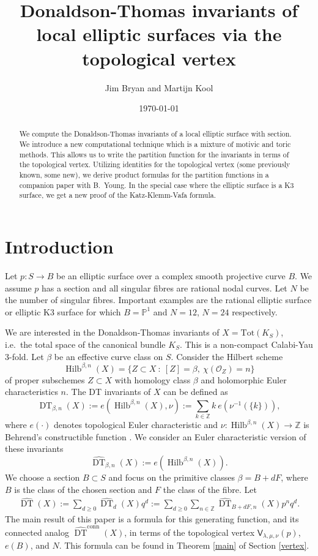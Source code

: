 \documentclass{amsart}
\title[DT invariants of local elliptic surfaces]{Donaldson-Thomas invariants of local elliptic surfaces via the topological vertex}
\author{Jim Bryan and Martijn Kool}
\date{\today}
\theoremstyle{definition}
\newcommand{\ZZ} {\mathbb{Z}}		%
\newcommand{\PP} {\mathbb{P}}
\renewcommand{\O}{\mathcal{O}}
\newcommand{\sfV}{\mathsf{V}}
\newcommand{\Hilb}{\operatorname{Hilb}}
\newcommand{\DT}{\operatorname{DT}}
\newcommand{\conn}{\operatorname{conn}}
\begin{document}
\begin{abstract}

We compute the Donaldson-Thomas invariants of a local elliptic surface
with section. We introduce a new computational technique which is a
mixture of motivic and toric methods. This allows us to write the
partition function for the invariants in terms of the topological
vertex. Utilizing identities for the topological vertex (some
previously known, some new), we derive product formulas for the
partition functions in a companion paper with B.~Young. In the special case where the elliptic surface is
a K3 surface, we get a new proof of the Katz-Klemm-Vafa formula.
\end{abstract}

\maketitle 





\section{Introduction}

Let $p : S \rightarrow B$ be an elliptic surface over a complex smooth projective curve $B$. We assume $p$ has a section and all singular fibres are rational nodal curves. Let $N$ be the number of singular fibres. Important examples are the rational elliptic surface or elliptic K3 surface for which $B = \PP^1$ and $N = 12$, $N=24$ respectively.

We are interested in the Donaldson-Thomas invariants of $X = \mathrm{Tot}(K_S)$, i.e.~the total space of the canonical bundle $K_S$. This is a non-compact Calabi-Yau 3-fold. Let $\beta$ be an effective curve class on $S$. Consider the Hilbert scheme 
$$
\Hilb^{\beta,n}(X) = \{ Z \subset X \ : \ [Z] = \beta, \ \chi(\O_Z) = n\}
$$
of proper subschemes $Z \subset X$ with homology class $\beta$ and holomorphic Euler characteristics $n$. The DT invariants of $X$ can be defined as
$$
\DT_{\beta,n}(X) := e(\Hilb^{\beta,n}(X), \nu) := \sum_{k \in \ZZ} k \ e(\nu^{-1}(\{k\})),
$$
where $e(\cdot)$ denotes topological Euler characteristic and $\nu : \Hilb^{\beta,n}(X) \rightarrow \ZZ$ is Behrend's constructible function \cite{Beh}. We consider an Euler characteristic version of these invariants
$$
\widehat{\DT}_{\beta,n}(X) := e(\Hilb^{\beta,n}(X)).
$$
We choose a section $B \subset S$ and focus on the primitive classes $\beta = B + dF$, where $B$ is the class of the chosen section and $F$ the class of the fibre. Let 
\begin{align*}
\widehat{\DT}(X) := \sum_{d \geq 0} \widehat{\DT}_d(X) q^d := \sum_{d \geq 0} \sum_{n \in \ZZ} \widehat{\DT}_{B+dF,n}(X) p^n q^d.
\end{align*}
The main result of this paper is a formula for this generating function, and its connected analog $\widehat{\DT}^{\conn}(X)$, in terms of the topological vertex $\sfV_{\lambda,\mu,\nu}(p)$, $e(B)$, and $N$. This formula can be found in Theorem \ref{main} of Section \ref{vertex}.
\end{document}
